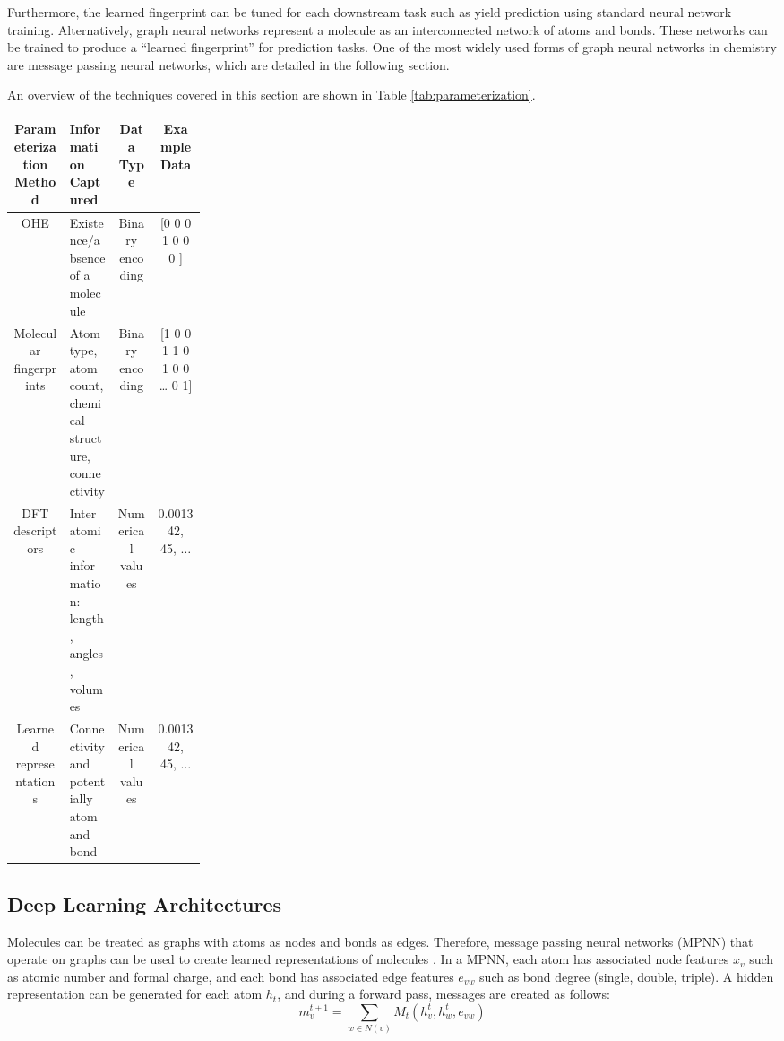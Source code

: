 Furthermore, the learned fingerprint can be tuned for each downstream task such as yield prediction using standard neural network training. Alternatively, graph neural networks represent a molecule as an interconnected network of atoms and bonds. These networks can be trained to produce a “learned fingerprint” for prediction tasks. One of the most widely used forms of graph neural networks in chemistry are message passing neural networks, which are detailed in the following section.

An overview of the techniques covered in this section are shown in Table \ref{tab:parameterization}.

\begin{sidewaystable}
    \caption{Overview of the commonly used molecular parameterization techniques for modelling chemical data.}
    \begin{tabular}{cp{0.25\linewidth}cc}
         Parameterization
    Method & Information Captured & Data Type & Example Data  \\
        \hline
         OHE & Existence/absence of a molecule & Binary encoding & [0 0 0 1 0 0 0 ] \\
         Molecular fingerprints & Atom type, atom count, chemical structure, connectivity & Binary encoding & [1 0 0 1 1 0 1 0 0 … 0 1] \\
         DFT descriptors & Inter atomic information: length, angles, volumes &  Numerical values & 0.001342, 45, $\dots$ \\
         Learned representations & Connectivity and potentially atom and bond & Numerical values & 0.001342, 45, $\dots$
    \end{tabular}
    \label{tab:parameterization}
\end{sidewaystable}

\subsection{Deep Learning Architectures}

Molecules can be treated as graphs with atoms as nodes and bonds as edges. Therefore, message passing neural networks (MPNN) that operate on graphs can be used to create learned representations of molecules \cite{Gilmer2017}.  In a MPNN, each atom has associated node features $x_v$ such as atomic number and formal charge, and each bond has associated edge features $e_{vw}$ such as bond degree (single, double, triple). A hidden representation can be generated for each atom $h_t$, and  during a forward pass, messages are created as follows:
\begin{equation}
    m_v^{t+1} = \sum_{w\in N(v)} M_t(h_v^t, h_w^t, e_{vw})
\end{equation}

